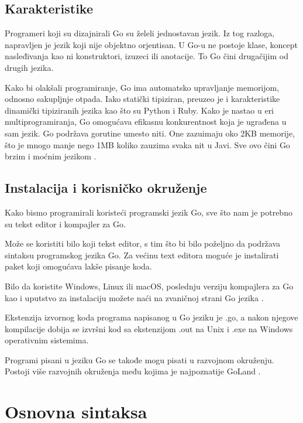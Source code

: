 \documentclass[a4paper]{article}
\begin{document}
\subsection{Karakteristike}
\label{subsec:karakteristike}

Programeri koji su dizajnirali Go su želeli jednostavan jezik. Iz tog razloga, napravljen je jezik koji nije objektno orjentisan. U Go-u ne postoje klase, koncept nasleđivanja kao ni konstruktori, izuzeci ili anotacije. To Go čini drugačijim od drugih jezika. 

Kako bi olakšali programiranje, Go ima automatsko upravljanje memorijom, odnosno sakupljnje otpada. Iako statički tipiziran, preuzeo je i karakteristike dinamički tipiziranih jezika kao što su Python i Ruby.  Kako je nastao u eri multiprogramiranja, Go omogućava efikasnu konkurentnost koja je ugrađena u sam jezik. Go podržava gorutine umesto niti. One zazuimaju oko 2KB memorije, što je mnogo manje nego 1MB koliko zauzima svaka nit u Javi. Sve ovo čini Go brzim i moćnim jezikom \cite{article}.



\subsection{Instalacija i korisničko okruženje}
\label{subsec:karakteristike1}

Kako bismo programirali koristeći programski jezik Go, sve što nam je potrebno su tekst editor i kompajler za Go.

Može se koristiti bilo koji tekst editor, s tim što bi bilo poželjno da podržava sintaksu programskog jezika Go. Za većinu text editora moguće je instalirati paket koji omogućava lakše pisanje koda.

Bilo da koristite Windows, Linux ili macOS, poslednju verziju kompajlera za Go kao i uputstvo za instalaciju možete naći na zvaničnoj strani Go jezika \cite{golang}.

Ekstenzija izvornog koda programa napisanog u Go jeziku je .go, a nakon njegove kompilacije dobija se izvršni kod sa ekstenzijom .out na Unix i .exe na Windows operativnim sistemima. 

Programi pisani u jeziku Go se takođe mogu pisati u razvojnom okruženju. Postoji više razvojnih okruženja među kojima je najpoznatije GoLand \cite{GoLend}.



\section{Osnovna sintaksa}
\label{osnovna_sintaksa}
\end{document}

